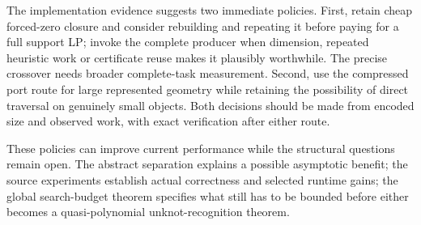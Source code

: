 The implementation evidence suggests two immediate policies. First,
retain cheap forced-zero closure and consider rebuilding and repeating
it before paying for a full support LP; invoke the complete producer
when dimension, repeated heuristic work or certificate reuse makes it
plausibly worthwhile. The precise crossover needs broader complete-task
measurement. Second, use the compressed port route for large represented
geometry while retaining the possibility of direct traversal on genuinely
small objects. Both decisions should be made from encoded size and
observed work, with exact verification after either route.

These policies can improve current performance while the structural
questions remain open. The abstract separation explains a possible
asymptotic benefit; the source experiments establish actual correctness
and selected runtime gains; the global search-budget theorem specifies
what still has to be bounded before either becomes a quasi-polynomial
unknot-recognition theorem.
